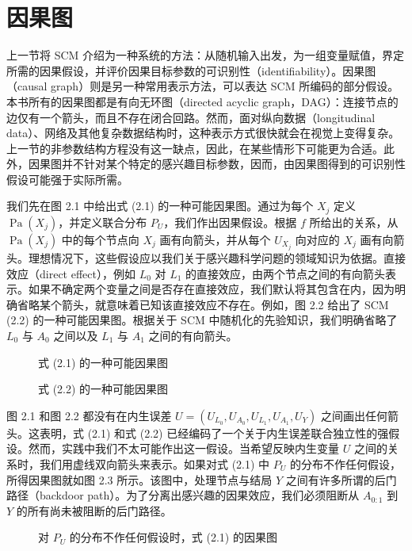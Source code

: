 \section{因果图}
\label{sec:ch02-causal-graphs}

上一节将 SCM 介绍为一种系统的方法：从随机输入出发，为一组变量赋值，界定所需的因果假设，并评价因果目标参数的可识别性（identifiability）。因果图（causal graph）则是另一种常用表示方法，可以表达 SCM 所编码的部分假设。本书所有的因果图都是有向无环图（directed acyclic graph，DAG）：连接节点的边仅有一个箭头，而且不存在闭合回路。然而，面对纵向数据（longitudinal data）、网络及其他复杂数据结构时，这种表示方式很快就会在视觉上变得复杂。上一节的非参数结构方程没有这一缺点，因此，在某些情形下可能更为合适。此外，因果图并不针对某个特定的感兴趣目标参数，因而，由因果图得到的可识别性假设可能强于实际所需。

我们先在图 2.1 中给出式 (2.1) 的一种可能因果图。通过为每个 $X_j$ 定义 $\operatorname{Pa}(X_j)$，并定义联合分布 $P_U$，我们作出因果假设。根据 $f$ 所给出的关系，从 $\operatorname{Pa}(X_j)$ 中的每个节点向 $X_j$ 画有向箭头，并从每个 $U_{X_j}$ 向对应的 $X_j$ 画有向箭头。理想情况下，这些假设应以我们关于感兴趣科学问题的领域知识为依据。直接效应（direct effect），例如 $L_0$ 对 $L_1$ 的直接效应，由两个节点之间的有向箭头表示。如果不确定两个变量之间是否存在直接效应，我们默认将其包含在内，因为明确省略某个箭头，就意味着已知该直接效应不存在。例如，图 2.2 给出了 SCM (2.2) 的一种可能因果图。根据关于 SCM 中随机化的先验知识，我们明确省略了 $L_0$ 与 $A_0$ 之间以及 $L_1$ 与 $A_1$ 之间的有向箭头。

\begin{figure}[htbp]
 \centering
 
 \caption{式 (2.1) 的一种可能因果图}
 \label{fig:ch02-causal-21}
\end{figure}

\begin{figure}[htbp]
 \centering
 
 \caption{式 (2.2) 的一种可能因果图}
 \label{fig:ch02-causal-22}
\end{figure}

图 2.1 和图 2.2 都没有在内生误差 $U=(U_{L_0},U_{A_0},U_{L_1},U_{A_1},U_Y)$ 之间画出任何箭头。这表明，式 (2.1) 和式 (2.2) 已经编码了一个关于内生误差联合独立性的强假设。然而，实践中我们不太可能作出这一假设。当希望反映内生变量 $U$ 之间的关系时，我们用虚线双向箭头来表示。如果对式 (2.1) 中 $P_U$ 的分布不作任何假设，所得因果图就如图 2.3 所示。该图中，处理节点与结局 $Y$ 之间有许多所谓的后门路径（backdoor path）。为了分离出感兴趣的因果效应，我们必须阻断从 $A_{0:1}$ 到 $Y$ 的所有尚未被阻断的后门路径。

\begin{figure}[htbp]
 \centering
 
 \caption{对 $P_U$ 的分布不作任何假设时，式 (2.1) 的因果图}
 \label{fig:ch02-causal-23}
\end{figure}
\FloatBarrier
